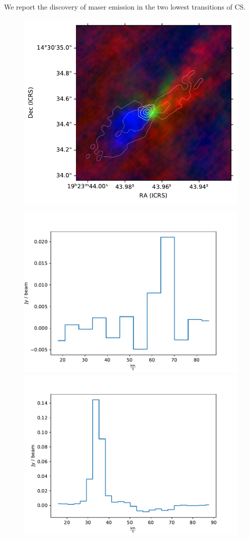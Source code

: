 

We report the discovery of maser emission in the two lowest transitions of CS.

\begin{figure}
    \includegraphics{figures/W51e2e_sio_outflow_with_CS_contours.pdf}
\end{figure}

\begin{figure}
\includegraphics{figures/CS1-0_maser_Jy.pdf}
\includegraphics{figures/CS2-1_maser_Jy.pdf}
\end{figure}




